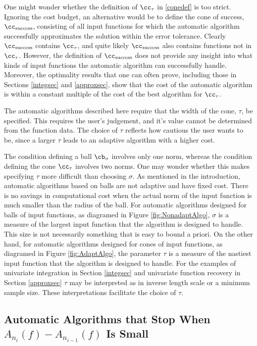 \documentclass[]{elsarticle}
\theoremstyle{definition}
\theoremstyle{remark}
\begin{document}
One might wonder whether the definition of $\cc_{\tau}$ in \eqref{conedef} is too strict.  Ignoring the cost budget, an alternative would be to define the cone of success, $\cc_{\text{success}}$, consisting of all input functions for which the automatic algorithm successfully approximates the solution within the error tolerance.  Clearly $\cc_{\text{success}}$ contains $\cc_{\tau}$, and quite likely $\cc_{\text{success}}$ also contains functions not in $\cc_{\tau}$.  However, the definition of $\cc_{\text{success}}$ does not provide any insight into what kinds of input functions the automatic algorithm can successfully handle.  Moreover, the optimality results that one can often prove, including those in Sections \ref{integsec} and \ref{approxsec}, show that the cost of the automatic algorithm is within a constant multiple of the cost of the best algorithm for $\cc_{\tau}$.

The automatic algorithms described here require that the width of the cone, $\tau$, be specified.  This requires the user's judgement, and it's value cannot be determined from the function data.  The choice of $\tau$ reflects how cautious the user wants to be, since a larger $\tau$ leads to an adaptive algorithm with a higher cost. 

The condition defining a ball $\cb_{\sigma}$ involves only one norm, whereas the condition defining the cone $\cc_{\tau}$ involves two norms.  One may wonder whether this makes specifying $\tau$ more difficult than choosing $\sigma$.  As mentioned in the introduction, automatic algorithms based on balls are not adaptive and have fixed cost. There is no savings in computational cost when the actual norm of the input function is much smaller than the radius of the ball. For automatic algorithms designed for balls of input functions, as diagramed in Figure \ref{fig:NonadaptAlgo},  $\sigma$ is a measure of the largest input function that the algorithm is designed to handle.  This size is not necessarily something that is easy to bound a priori.  On the other hand, for automatic algorithms designed for cones of input functions, as diagramed in Figure \ref{fig:AdaptAlgo}, the parameter $\tau$ is a measure of the nastiest input function that the algorithm is designed to handle.  For the examples of univariate integration in Section \ref{integsec} and univariate function recovery in Section \ref{approxsec} $\tau$ may be interpreted as in inverse length scale or a minimum sample size. These interpretations facilitate the choice of $\tau$. 

\subsection{Automatic Algorithms that Stop When $A_{n_{i}}(f)-A_{n_{i-1}}(f)$ Is Small}
\end{document}
